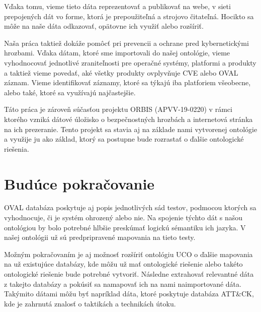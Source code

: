 \documentclass[12pt, a4paper, oneside]{book}
\begin{document}
Vďaka tomu, vieme tieto dáta reprezentovať a publikovať na webe, v sieti prepojených dát vo forme, ktorá je prepoužiteľná a
strojovo čitateľná. Hocikto sa môže na naše dáta odkazovať, opätovne ich využiť alebo rozšíriť. 


Naša práca taktiež dokáže pomôcť pri prevencii a ochrane pred
kybernetickými hrozbami. Vďaka dátam, ktoré sme importovali do našej ontológie, vieme vyhodnocovať jednotlivé zraniteľnosti pre operačné systémy, platformi a produkty a taktiež vieme povedať, aké všetky produkty ovplyvňuje CVE alebo OVAL záznam. Vieme identifikovať záznamy, ktoré sa týkajú iba platforiem všeobecne, alebo také, ktoré sa využívajú najčastejšie.


Táto práca je zároveň súčasťou projektu ORBIS (APVV-19-0220) v rámci ktorého vzniká dátové úložisko o bezpečnostných hrozbách a internetová stránka na ich prezeranie. Tento projekt sa stavia aj na základe nami vytvorenej ontológie a využije ju ako základ, ktorý sa postupne bude rozrastať o ďalšie ontologické riešenia.


\section*{Budúce pokračovanie}
OVAL databáza poskytuje aj popis jednotlivých sád testov, podmocou ktorých sa vyhodnocuje, či je systém ohrozený alebo nie. Na spojenie týchto dát s našou ontológiou by bolo potrebné hlbšie preskúmať logickú sémantiku ich jazyka. V našej ontológii už sú predpripravené mapovania na tieto testy.


Možným pokračovaním je aj možnosť rozšíriť ontológiu UCO o ďalšie mapovania na už existujúce databázy, kde môžu už mať ontologické riešenie alebo takéto ontologické riešenie bude potrebné vytvoriť. Následne extrahovať relevantné dáta z takejto databázy a pokúsiť sa namapovať ich na nami naimportované dáta. Takýmito dátami môžu byť napríklad dáta, ktoré poskytuje databáza ATT\&{}CK\citep{attck}, kde je zahrnutá znalosť o taktikách a technikách útoku.
\end{document}
